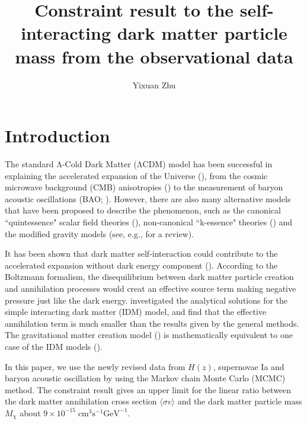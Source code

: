 \documentclass[twocolumn]{aastex631}
\begin{document}
 

   \title{Constraint result to the self-interacting dark matter particle mass from the
   observational data}

   \author{Yixuan Zhu}
 
   \begin{abstract}

   \end{abstract}
   
   \keywords{}

\section{Introduction}\label{sec:1}

   The standard Λ-Cold Dark Matter (ΛCDM) model has been successful in 
   explaining the accelerated expansion of the Universe (\cite{Riess_1998,Perlmutter_1999}), 
   from the cosmic microwave background (CMB) anisotropies (\cite{Bennett_1996}) to 
   the measurement of baryon acoustic oscillations (BAO; \cite{Eisenstein_2005}). 
   However, there are also many alternative models that have been proposed to describe 
   the phenomenon, such as the canonical ``quintessence" scalar field theories 
   (\cite{PhysRevD.37.3406, WETTERICH1988668,PhysRevLett.80.1582}),
   non-canonical ``k-essence" theories (\cite{PhysRevLett.85.4438, PhysRevD.63.103510})
   and the modified gravity models (see, e.g., \cite{CLIFTON20121} for a review).

   It has been shown that dark matter self-interaction could contribute 
   to the accelerated expansion without dark energy component (\cite{PhysRevD.64.063501, Balakin_2003}). 
   According to the Boltzmann formalism, the disequilibrium between dark matter particle
   creation and annihilation processes would creat an effective source term 
   making negative pressure just like the dark energy. \cite{Basilakos_2009}
   investigated the analytical solutions for the simple interacting dark matter (IDM) 
   model, and find that the effective annihilation term is much smaller than the
   results given by the general methods. The gravitational matter creation model (\cite{Lima_2008})
   is mathematically equivalent to one case of the IDM models (\cite{Basilakos_2009}).

   In this paper, we use the newly revised data from $H(z)$, supernovae Ia 
   and baryon acoustic oscillation by using the Markov chain Monte
   Carlo (MCMC) method. The constraint result gives an upper limit for the 
   linear ratio between the dark matter annihilation cross section $\langle\sigma v\rangle$
   and the dark matter particle mass $M_{\chi}$ about $9\times10^{-15} \;\text{cm}^{3}\text{s}^{-1}\text{GeV}^{-1}$. 
\end{document}
